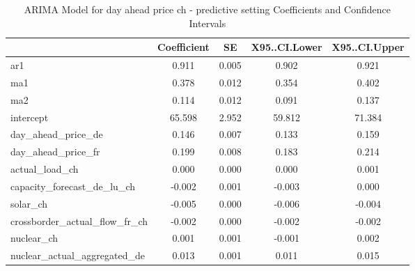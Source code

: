 \begin{table}
\caption{ARIMA Model for day ahead price ch - predictive setting Coefficients and Confidence Intervals}
\centering
\begin{tabular}[t]{l|c|c|c|c}
\hline
  & Coefficient & SE & X95..CI.Lower & X95..CI.Upper\\
\hline
ar1 & 0.911 & 0.005 & 0.902 & 0.921\\
\hline
ma1 & 0.378 & 0.012 & 0.354 & 0.402\\
\hline
ma2 & 0.114 & 0.012 & 0.091 & 0.137\\
\hline
intercept & 65.598 & 2.952 & 59.812 & 71.384\\
\hline
day\_ahead\_price\_de & 0.146 & 0.007 & 0.133 & 0.159\\
\hline
day\_ahead\_price\_fr & 0.199 & 0.008 & 0.183 & 0.214\\
\hline
actual\_load\_ch & 0.000 & 0.000 & 0.000 & 0.001\\
\hline
capacity\_forecast\_de\_lu\_ch & -0.002 & 0.001 & -0.003 & 0.000\\
\hline
solar\_ch & -0.005 & 0.000 & -0.006 & -0.004\\
\hline
crossborder\_actual\_flow\_fr\_ch & -0.002 & 0.000 & -0.002 & -0.002\\
\hline
nuclear\_ch & 0.001 & 0.001 & -0.001 & 0.002\\
\hline
nuclear\_actual\_aggregated\_de & 0.013 & 0.001 & 0.011 & 0.015\\
\hline
\end{tabular}
\end{table}\begin{table}


\end{table}
